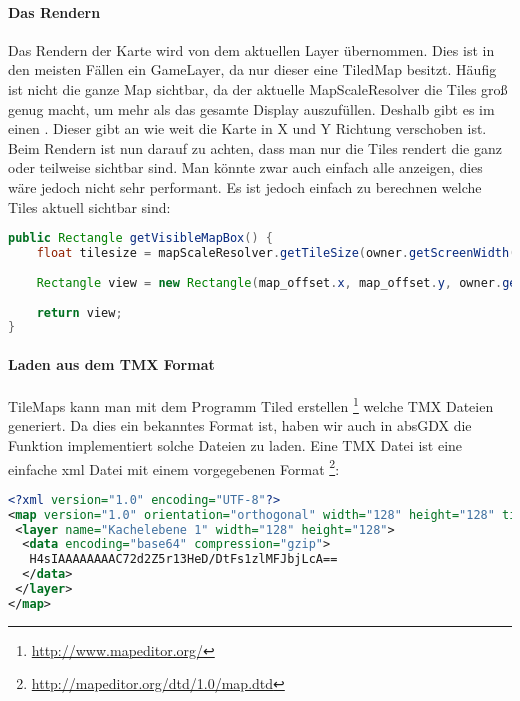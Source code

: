 
\paragraph{Das Rendern}

Das Rendern der Karte wird von dem aktuellen Layer übernommen. Dies ist in den meisten Fällen ein GameLayer, da nur dieser eine TiledMap besitzt.
Häufig ist nicht die ganze Map sichtbar, da der aktuelle MapScaleResolver die Tiles groß genug macht, um mehr als das gesamte Display auszufüllen. Deshalb gibt es im  einen . Dieser gibt an wie weit die Karte in X und Y Richtung verschoben ist.
Beim Rendern ist nun darauf zu achten, dass man nur die Tiles rendert die ganz oder teilweise sichtbar sind. Man könnte zwar auch einfach alle anzeigen, dies wäre jedoch nicht sehr performant. Es ist jedoch einfach zu berechnen welche Tiles aktuell sichtbar sind:\cite[S 232f.]{DGIJ}

\doinline
\begin{lstlisting}[caption=Ermitteln der aktuell sichtbare Tiles, title=\hspace{0 pt}, language=java]
public Rectangle getVisibleMapBox() {
	float tilesize = mapScaleResolver.getTileSize(owner.getScreenWidth(), owner.getScreenHeight(), map.height, map.width);
	
	Rectangle view = new Rectangle(map_offset.x, map_offset.y, owner.getScreenWidth() / tilesize, owner.getScreenHeight() / tilesize);
	
	return view;
}
\end{lstlisting}

\paragraph{Laden aus dem TMX Format}

TileMaps kann man mit dem Programm Tiled erstellen \footnote{\url{http://www.mapeditor.org/}} welche TMX Dateien generiert. Da dies ein bekanntes Format ist, haben wir auch in absGDX die Funktion implementiert solche Dateien zu laden. Eine TMX Datei ist eine einfache xml Datei mit einem vorgegebenen Format \footnote{\url{http://mapeditor.org/dtd/1.0/map.dtd}}:

\doinline
\begin{lstlisting}[caption=Beipiel einer TMX Datei, title=\hspace{0 pt}, language=xml]
<?xml version="1.0" encoding="UTF-8"?>
<map version="1.0" orientation="orthogonal" width="128" height="128" tilewidth="16" tileheight="16">
 <layer name="Kachelebene 1" width="128" height="128">
  <data encoding="base64" compression="gzip">
   H4sIAAAAAAAAC72d2Z5r13HeD/DtFs1zlMFJbjLcA==
  </data>
 </layer>
</map>
\end{lstlisting}

